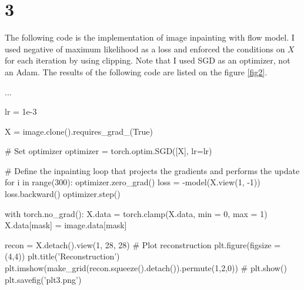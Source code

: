 \documentclass[10pt]{article}
\begin{document}
\section*{3}
The following code is the implementation of image inpainting with flow model. 
I used negative of maximum likelihood as a loss and enforced the conditions on $X$ for each iteration by using clipping.
Note that I used SGD as an optimizer, not an Adam. The results of the following code are listed on the figure \ref{fig2}.
\begin{python}
... 

lr = 1e-3

X = image.clone().requires_grad_(True)

# Set optimizer
optimizer = torch.optim.SGD([X], lr=lr)

# Define the inpainting loop that projects the gradients and performs the update
for i in range(300):
    optimizer.zero_grad()
    loss = -model(X.view(1, -1))
    loss.backward()
    optimizer.step()

    with torch.no_grad():
        X.data = torch.clamp(X.data, min = 0, max = 1)
        X.data[mask] = image.data[mask]

recon = X.detach().view(1, 28, 28)
# Plot reconstruction
plt.figure(figsize = (4,4))
plt.title('Reconstruction')
plt.imshow(make_grid(recon.squeeze().detach()).permute(1,2,0))
# plt.show()
plt.savefig('plt3.png')
\end{python}
\end{document}
